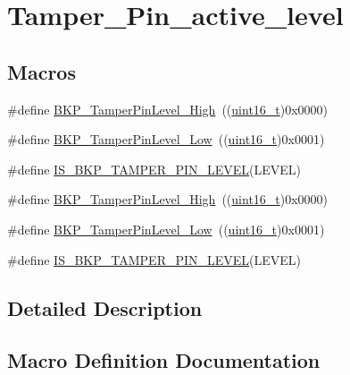 \hypertarget{group___tamper___pin__active__level}{}\section{Tamper\+\_\+\+Pin\+\_\+active\+\_\+level}
\label{group___tamper___pin__active__level}
\subsection*{Macros}
\begin{DoxyCompactItemize}
\item 
\#define \hyperlink{group___tamper___pin__active__level_gae7203c3c0202cd68d201278c8be2b967}{B\+K\+P\+\_\+\+Tamper\+Pin\+Level\+\_\+\+High}~((\hyperlink{_p_e___types_8h_a1f1825b69244eb3ad2c7165ddc99c956}{uint16\+\_\+t})0x0000)
\item 
\#define \hyperlink{group___tamper___pin__active__level_gade9fc51f494eddcc4d88679c80fe39ce}{B\+K\+P\+\_\+\+Tamper\+Pin\+Level\+\_\+\+Low}~((\hyperlink{_p_e___types_8h_a1f1825b69244eb3ad2c7165ddc99c956}{uint16\+\_\+t})0x0001)
\item 
\#define \hyperlink{group___tamper___pin__active__level_gae7cd3bd314605f7752062c814b850c23}{I\+S\+\_\+\+B\+K\+P\+\_\+\+T\+A\+M\+P\+E\+R\+\_\+\+P\+I\+N\+\_\+\+L\+E\+V\+EL}(L\+E\+V\+EL)
\item 
\#define \hyperlink{group___tamper___pin__active__level_gae7203c3c0202cd68d201278c8be2b967}{B\+K\+P\+\_\+\+Tamper\+Pin\+Level\+\_\+\+High}~((\hyperlink{_p_e___types_8h_a1f1825b69244eb3ad2c7165ddc99c956}{uint16\+\_\+t})0x0000)
\item 
\#define \hyperlink{group___tamper___pin__active__level_gade9fc51f494eddcc4d88679c80fe39ce}{B\+K\+P\+\_\+\+Tamper\+Pin\+Level\+\_\+\+Low}~((\hyperlink{_p_e___types_8h_a1f1825b69244eb3ad2c7165ddc99c956}{uint16\+\_\+t})0x0001)
\item 
\#define \hyperlink{group___tamper___pin__active__level_gae7cd3bd314605f7752062c814b850c23}{I\+S\+\_\+\+B\+K\+P\+\_\+\+T\+A\+M\+P\+E\+R\+\_\+\+P\+I\+N\+\_\+\+L\+E\+V\+EL}(L\+E\+V\+EL)
\end{DoxyCompactItemize}


\subsection{Detailed Description}


\subsection{Macro Definition Documentation}
